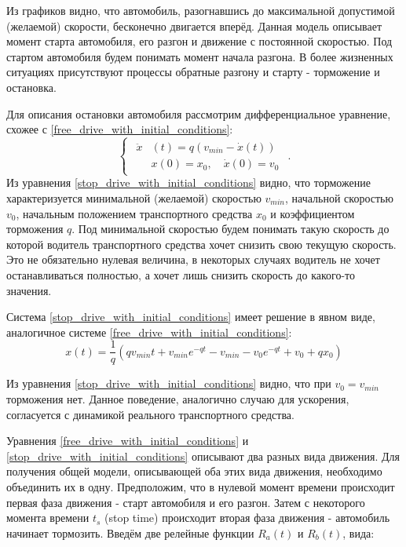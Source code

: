 \documentclass[12pt, a4paper]{extarticle}
\numberwithin{equation}{section}
\begin{document}
Из графиков видно, что автомобиль, разогнавшись до максимальной допустимой (желаемой) скорости, бесконечно двигается вперёд. Данная модель описывает момент старта автомобиля, его разгон и движение с постоянной скоростью. Под стартом автомобиля будем понимать момент начала разгона. В более жизненных ситуациях присутствуют процессы обратные разгону и старту - торможение и остановка.

Для описания остановки автомобиля рассмотрим дифференциальное уравнение, схожее с \eqref{free_drive_with_initial_conditions}: 
\begin{equation} \label{stop_drive_with_initial_conditions}
\begin{cases}
\begin{split}
\ddot{x}&(t) = q\left( v_{min} - \dot{x}(t)\right) \\
&x(0)=x_0, \quad \dot{x}(0)=v_0
\end{split}
\end{cases}.
\end{equation}
Из уравнения \eqref{stop_drive_with_initial_conditions} видно, что торможение характеризуется минимальной (желаемой) скоростью $v_{min}$, начальной скоростью $v_{0}$, начальным положением транспортного средства $x_0$ и коэффициентом торможения $q$. Под минимальной скоростью будем понимать такую скорость до которой водитель транспортного средства хочет снизить свою текущую скорость. Это не обязательно нулевая величина, в некоторых случаях водитель не хочет останавливаться полностью, а хочет лишь снизить скорость до какого-то значения.

Система \eqref{stop_drive_with_initial_conditions} имеет решение в явном виде, аналогичное системе \eqref{free_drive_with_initial_conditions}:
\begin{equation*}
x(t) = \dfrac{1}{q}\left(qv_{min}t+v_{min}e^{-qt}-v_{min}-v_0e^{-qt}+v_0+qx_0\right) 
\end{equation*}

Из уравнения \eqref{stop_drive_with_initial_conditions} видно, что при $v_0=v_{min}$ торможения нет. Данное поведение, аналогично случаю для ускорения, согласуется с динамикой реального транспортного средства.

Уравнения \eqref{free_drive_with_initial_conditions} и  \eqref{stop_drive_with_initial_conditions} описывают два разных вида движения. Для получения общей модели, описывающей оба этих вида движения, необходимо объединить их в одну. Предположим, что в нулевой момент времени происходит первая фаза движения - старт автомобиля и его разгон. Затем с некоторого момента времени $t_s$ (stop time) происходит вторая фаза движения - автомобиль начинает тормозить. Введём две релейные функции $R_{a}(t)$ и $R_{b}(t)$, вида:  
\end{document}
